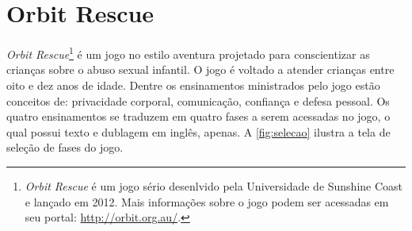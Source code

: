 



\section{Orbit Rescue}\label{sssec:Orbit}


\textit{Orbit Rescue}\footnote{\textit{Orbit Rescue} é um jogo sério desenlvido pela Universidade de Sunshine Coast e lançado em 2012. Mais informações sobre o jogo podem ser acessadas em seu portal: \url{http://orbit.org.au/}.} é um jogo no estilo aventura projetado para conscientizar as crianças sobre o abuso sexual infantil. O jogo é voltado a atender crianças entre oito e dez anos de idade. Dentre os ensinamentos ministrados pelo jogo estão conceitos de: privacidade corporal, comunicação, confiança e defesa pessoal. Os quatro ensinamentos se traduzem em quatro fases a serem acessadas no jogo, o qual possui texto e dublagem em inglês, apenas. A \autoref{fig:selecao} ilustra a tela de seleção de fases do jogo.

